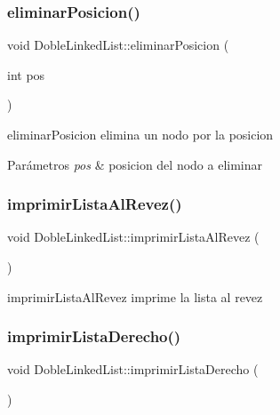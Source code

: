 \subsubsection{\texorpdfstring{eliminar\+Posicion()}{eliminarPosicion()}}
{\footnotesize\ttfamily void Doble\+Linked\+List\+::eliminar\+Posicion (\begin{DoxyParamCaption}\item[{int}]{pos }\end{DoxyParamCaption})\hspace{0.3cm}{\ttfamily [inline]}}



eliminar\+Posicion elimina un nodo por la posicion 


\begin{DoxyParams}{Parámetros}
{\em pos} & posicion del nodo a eliminar \\
\hline
\end{DoxyParams}
\mbox{\label{class_doble_linked_list_a9f02eca02307a94a532424a356da4025}} 
\subsubsection{\texorpdfstring{imprimir\+Lista\+Al\+Revez()}{imprimirListaAlRevez()}}
{\footnotesize\ttfamily void Doble\+Linked\+List\+::imprimir\+Lista\+Al\+Revez (\begin{DoxyParamCaption}{ }\end{DoxyParamCaption})\hspace{0.3cm}{\ttfamily [inline]}}



imprimir\+Lista\+Al\+Revez imprime la lista al revez 

\mbox{\label{class_doble_linked_list_afc95087af1c6fbf8ac288aa1f7615d5e}} 
\subsubsection{\texorpdfstring{imprimir\+Lista\+Derecho()}{imprimirListaDerecho()}}
{\footnotesize\ttfamily void Doble\+Linked\+List\+::imprimir\+Lista\+Derecho (\begin{DoxyParamCaption}{ }\end{DoxyParamCaption})\hspace{0.3cm}{\ttfamily [inline]}}



